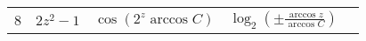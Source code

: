 \begin{table}
\begin{center}
{\begin{tabular}{r|l|l|l|c}
8&$2z^2-1		$&$\cos(2^z \arccos C)	$&$\log_2\left(\pm \frac{\arccos z}{\arccos C}\right)	$&\\
\end{tabular}
}
\end{center}
\label{tabfac1}
\end{table}
